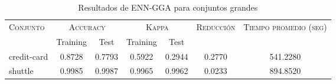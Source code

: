 \begin{table}[]
\centering
\begin{tabular}{l c c c c c c}
\hline
\multirow{2}{*}{\textsc{Conjunto}}
	& \multicolumn{2}{c}{\textsc{Accuracy}}
	& \multicolumn{2}{c}{\textsc{Kappa}}
	& \textsc{Reducción}
	& \textsc{Tiempo promedio (seg)} \\
	& Training & Test
	& Training & Test \\ 
\hline
\hline

credit-card & 0.8728 & 0.7793 & 0.5922 & 0.2944 & 0.2770 & 541.2280 \\
shuttle & 0.9985 & 0.9987 & 0.9965 & 0.9962 & 0.0233 & 894.8520 \\

\hline
\end{tabular}
\caption{Resultados de ENN-GGA para conjuntos grandes }
\label{res-grande-enn-gga}
\end{table}


